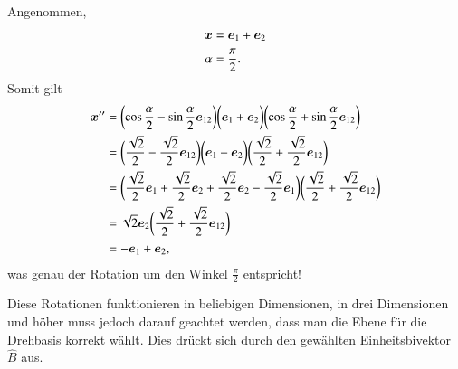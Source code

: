 \begin{beispiel}
Angenommen,
\begin{align*}
  \boldsymbol{x} &= \eone + \etwo \\
  \alpha &= \frac{\pi}{2}.
\end{align*}
Somit gilt
\bgroup
  \newcommand{\fraction}{\frac{\sqrt{2}}{2}}
  \begin{align*}
    \boldsymbol{x}'' &= \biggl( \cos{\frac{\alpha}{2}} - \sin{\frac{\alpha}{2}} \eot \biggr) \biggl(\eone + \etwo\biggr) \biggl(\cos{\frac{\alpha}{2}} + \sin{\frac{\alpha}{2}} \eot\biggr) \\
    &= \biggl( \fraction - \fraction \eot \biggr) \biggl(\eone + \etwo\biggr) \biggl( \fraction + \fraction \eot \biggr) \\
    &= \biggl( \fraction \eone + \fraction \etwo + \fraction \etwo - \fraction \eone \biggr) \biggl( \fraction + \fraction \eot \biggr) \\
    &= \sqrt{2} \etwo \biggl( \fraction + \fraction \eot \biggr) \\
    &= -\eone + \etwo,
  \end{align*}
\egroup
was genau der Rotation um den Winkel $\frac{\pi}2$ entspricht!
\end{beispiel}
Diese Rotationen funktionieren in beliebigen Dimensionen, in drei Dimensionen und höher muss jedoch darauf geachtet werden,
dass man die Ebene für die Drehbasis korrekt wählt. Dies drückt sich durch den gewählten Einheitsbivektor $\hat{B}$ aus.

